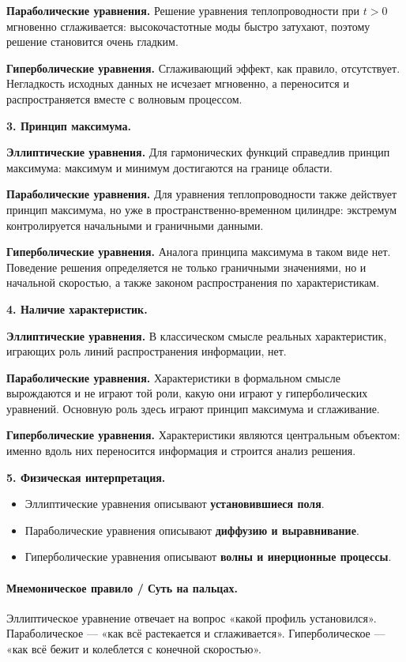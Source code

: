 \documentclass[a4paper,12pt]{article}
\begin{document}
\textbf{Параболические уравнения.}
Решение уравнения теплопроводности при $t>0$ мгновенно сглаживается: высокочастотные моды быстро затухают, поэтому решение становится очень гладким.

\textbf{Гиперболические уравнения.}
Сглаживающий эффект, как правило, отсутствует. Негладкость исходных данных не исчезает мгновенно, а переносится и распространяется вместе с волновым процессом.

\textbf{3. Принцип максимума.}

\textbf{Эллиптические уравнения.}
Для гармонических функций справедлив принцип максимума: максимум и минимум достигаются на границе области.

\textbf{Параболические уравнения.}
Для уравнения теплопроводности также действует принцип максимума, но уже в пространственно-временном цилиндре: экстремум контролируется начальными и граничными данными.

\textbf{Гиперболические уравнения.}
Аналога принципа максимума в таком виде нет. Поведение решения определяется не только граничными значениями, но и начальной скоростью, а также законом распространения по характеристикам.

\textbf{4. Наличие характеристик.}

\textbf{Эллиптические уравнения.}
В классическом смысле реальных характеристик, играющих роль линий распространения информации, нет.

\textbf{Параболические уравнения.}
Характеристики в формальном смысле вырождаются и не играют той роли, какую они играют у гиперболических уравнений. Основную роль здесь играют принцип максимума и сглаживание.

\textbf{Гиперболические уравнения.}
Характеристики являются центральным объектом: именно вдоль них переносится информация и строится анализ решения.

\textbf{5. Физическая интерпретация.}

\begin{itemize}
  \item Эллиптические уравнения описывают \textbf{установившиеся поля}.
  \item Параболические уравнения описывают \textbf{диффузию и выравнивание}.
  \item Гиперболические уравнения описывают \textbf{волны и инерционные процессы}.
\end{itemize}

\paragraph{Мнемоническое правило / Суть на пальцах.}
Эллиптическое уравнение отвечает на вопрос «какой профиль установился». Параболическое --- «как всё растекается и сглаживается». Гиперболическое --- «как всё бежит и колеблется с конечной скоростью».
\end{document}

